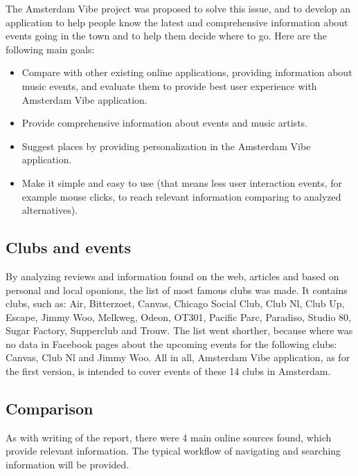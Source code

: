 \documentclass[12pt, a4paper, lithuanian]{article}
\begin{document}
  The Amsterdam Vibe project was proposed to solve this issue, and to develop an application to help people know the latest and comprehensive information about events going in the town and to help them decide where to go.
  Here are the following main goals:

\begin{itemize}

  \item Compare with other existing online applications, providing information about music events, and evaluate them to provide best user experience with Amsterdam Vibe application.

  \item Provide comprehensive information about events and music artists.

  \item Suggest places by providing personalization in the Amsterdam Vibe application.

  \item Make it simple and easy to use (that means less user interaction events, for example mouse clicks, to reach relevant information comparing to analyzed alternatives).

\end{itemize}

\subsection{Clubs and events}

  By analyzing reviews and information found on the web, articles and based on personal and local oponions, the list of most famous clubs was made. It contains clubs, such as: Air, Bitterzoet, Canvas, Chicago Social Club, Club Nl, Club Up, Escape, Jimmy Woo, Melkweg, Odeon, OT301, Pacific Parc, Paradiso, Studio 80, Sugar Factory, Supperclub and Trouw. The list went shorther, because where was no data in Facebook pages about the upcoming events for the following clubs: Canvas, Club Nl and Jimmy Woo. All in all, Amsterdam Vibe application, as for the first version, is intended to cover events of these 14 clubs in Amsterdam.

\subsection{Comparison}

  As with writing of the report, there were 4 main online sources found, which provide relevant information. The typical workflow of navigating and searching information will be provided.
\end{document}
